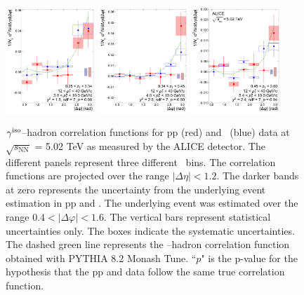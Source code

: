 \begin{figure}
    \includegraphics[width=0.3\textwidth]{Data_Analysis/gammahadron/Cs_Final_Indv_pT_0_zT_5.pdf}        
    \includegraphics[width=0.3\textwidth]{Data_Analysis/gammahadron/Cs_Final_Indv_pT_0_zT_6.pdf}        
    \includegraphics[width=0.3\textwidth]{Data_Analysis/gammahadron/Cs_Final_Indv_pT_0_zT_7.pdf}
    \caption{$\gamma^\mathrm{iso}$--hadron correlation functions for pp (red) and \pPb~(blue) data at $\sqrt{s_\mathrm{NN}}$ = 5.02 TeV as measured by the ALICE detector. The different panels represent three different \zt~bins. The correlation functions are projected over the range $|\Delta\eta| < 1.2$. The darker bands at zero represents the uncertainty from the underlying event estimation in pp and \pPb. The underlying event was estimated over the range $0.4 <|\Delta\varphi| < 1.6$. The vertical bars represent statistical uncertainties only. The boxes indicate the systematic uncertainties. The dashed green line represents the \gammaiso--hadron correlation function obtained with \textsc{PYTHIA 8.2} Monash Tune. ``$p$" is the p-value for the hypothesis that the pp and \pPb data follow the same true correlation function.
    }
     \label{fig:GH_Correlations}
 \end{figure}


